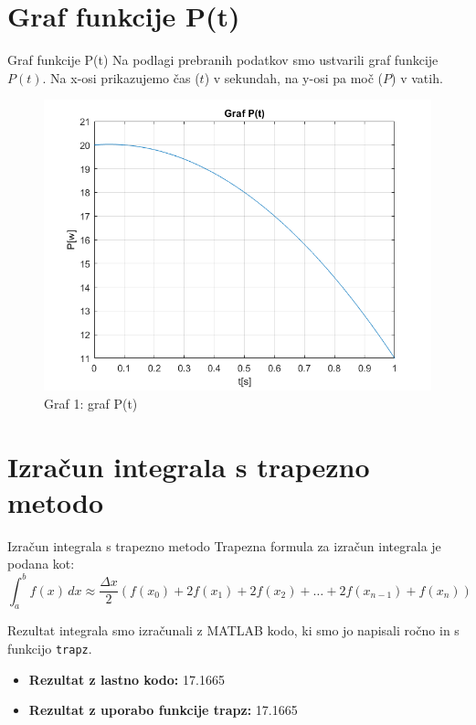 \documentclass{beamer}
\begin{document}
\section{Graf funkcije P(t)}
\begin{frame}{Graf funkcije P(t)}
    Na podlagi prebranih podatkov smo ustvarili graf funkcije $P(t)$. Na x-osi prikazujemo čas ($t$) v sekundah, na y-osi pa moč ($P$) v vatih.
    \begin{figure}
    \centering
    \includegraphics[width=0.7\linewidth]{slika grafa P(t).png}
    \caption{Graf 1: graf P(t)}
    \label{fig:enter-label}
    \end{figure}
\end{frame}

\section{Izračun integrala s trapezno metodo}
\begin{frame}{Izračun integrala s trapezno metodo}
    Trapezna formula za izračun integrala je podana kot:
    \[
    \int_{a}^{b} f(x) \, dx \approx \frac{\Delta x}{2} \left( f(x_0) + 2f(x_1) + 2f(x_2) + \dots + 2f(x_{n-1}) + f(x_n) \right)
    \]

    Rezultat integrala smo izračunali z MATLAB kodo, ki smo jo napisali ročno in s funkcijo \texttt{trapz}.

    \begin{itemize}
        \item \textbf{Rezultat z lastno kodo:} 17.1665
        \item \textbf{Rezultat z uporabo funkcije {trapz}:} 17.1665
    \end{itemize}
\end{frame}
\end{document}
